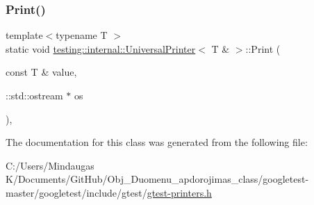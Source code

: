\subsubsection{\texorpdfstring{Print()}{Print()}\hspace{0.1cm}{\footnotesize\ttfamily [3/3]}}
{\footnotesize\ttfamily template$<$typename T $>$ \\
static void \mbox{\hyperlink{classtesting_1_1internal_1_1_universal_printer}{testing\+::internal\+::\+Universal\+Printer}}$<$ T \& $>$\+::Print (\begin{DoxyParamCaption}\item[{const T \&}]{value,  }\item[{\+::std\+::ostream $\ast$}]{os }\end{DoxyParamCaption})\hspace{0.3cm}{\ttfamily [inline]}, {\ttfamily [static]}}



The documentation for this class was generated from the following file\+:\begin{DoxyCompactItemize}
\item 
C\+:/\+Users/\+Mindaugas K/\+Documents/\+Git\+Hub/\+Obj\+\_\+\+Duomenu\+\_\+apdorojimas\+\_\+class/googletest-\/master/googletest/include/gtest/\mbox{\hyperlink{googletest-master_2googletest_2include_2gtest_2gtest-printers_8h}{gtest-\/printers.\+h}}\end{DoxyCompactItemize}
